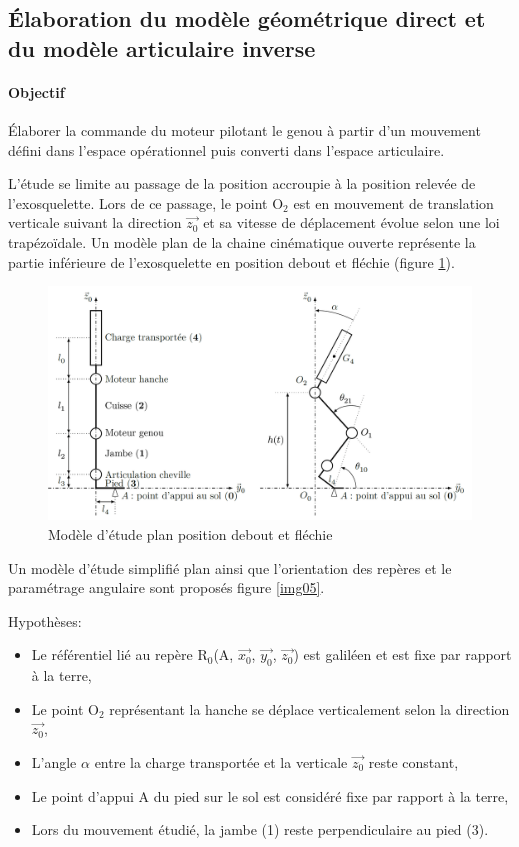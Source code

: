 \subsection{Élaboration du modèle géométrique direct et du modèle articulaire inverse}

\paragraph{Objectif}

Élaborer la commande du moteur pilotant le genou à partir d'un mouvement défini dans l'espace
opérationnel puis converti dans l'espace articulaire.

L'étude se limite au passage de la position accroupie à la position relevée de l'exosquelette. Lors de ce passage, le point O$_2$ est en mouvement de translation verticale suivant la direction $\overrightarrow{z_0}$ et sa vitesse de déplacement évolue selon une loi trapézoïdale. Un modèle plan de la chaine cinématique ouverte représente la partie inférieure de l'exosquelette en position debout et fléchie (figure \ref{img04}).

\begin{figure}[!h]
 \centering\includegraphics[width=0.9\linewidth]{img/fig04}
 \caption{Modèle d'étude plan position debout et fléchie}
 \label{img04}
\end{figure}

Un modèle d'étude simplifié plan ainsi que l'orientation des repères et le paramétrage angulaire sont proposés
figure \ref{img05}.

Hypothèses:
\begin{itemize}
 \item Le référentiel lié au repère R$_0$(A, $\overrightarrow{x_0}$, $\overrightarrow{y_0}$, $\overrightarrow{z_0}$) est galiléen et est fixe par rapport à la terre,
 \item Le point O$_2$ représentant la hanche se déplace verticalement selon la direction $\overrightarrow{z_0}$,
 \item L'angle $\alpha$ entre la charge transportée et la verticale $\overrightarrow{z_0}$ reste constant,
 \item Le point d'appui A du pied sur le sol est considéré fixe par rapport à la terre,
 \item Lors du mouvement étudié, la jambe (1) reste perpendiculaire au pied (3).
\end{itemize}


